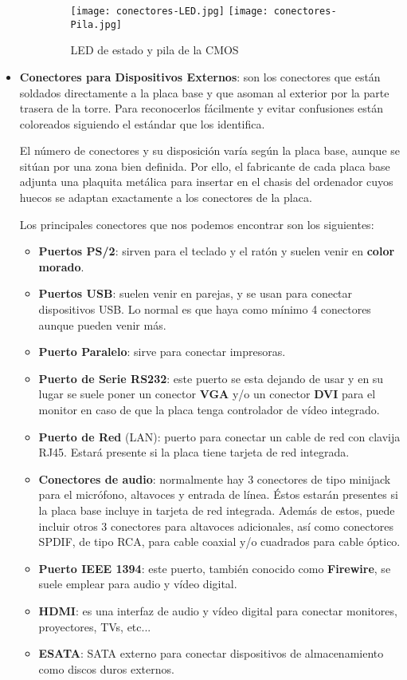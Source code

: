 \begin{itemize}
\begin{itemize}
     \begin{figure}[H]
         \centering
         \texttt{[image: conectores-LED.jpg]}  \hspace{2ex} \texttt{[image: conectores-Pila.jpg]}
         \caption{LED de estado y pila de la CMOS}
     \end{figure}
    \end{itemize}

    \item \textbf{Conectores para Dispositivos Externos}: son los conectores que están soldados directamente a la placa base y que asoman al exterior por la parte trasera de la torre. Para reconocerlos fácilmente y evitar confusiones están coloreados siguiendo el estándar que los identifica.

    El número de conectores y su disposición varía según la placa base, aunque se sitúan por una zona bien definida. Por ello, el fabricante de cada placa base adjunta una plaquita metálica para insertar en el chasis del ordenador cuyos huecos se adaptan exactamente a los conectores de la placa.

    Los principales conectores que nos podemos encontrar son los siguientes:

    \begin{itemize}
        \item \textbf{Puertos PS/2}: sirven para el teclado y el ratón y suelen venir en \textbf{color morado}.
        \item \textbf{Puertos USB}: suelen venir en parejas, y se usan para conectar dispositivos USB. Lo normal es que haya como mínimo 4 conectores aunque pueden venir más.
        \item \textbf{Puerto Paralelo}: sirve para conectar impresoras.
        \item \textbf{Puerto de Serie RS232}: este puerto se esta dejando de usar y en su lugar se suele poner un conector \textbf{VGA} y/o un conector \textbf{DVI} para el monitor en caso de que la placa tenga controlador de vídeo integrado.
        \item \textbf{Puerto de Red} (LAN): puerto para conectar un cable de red con clavija RJ45. Estará presente si la placa tiene tarjeta de red integrada.
        \item \textbf{Conectores de audio}: normalmente hay 3 conectores de tipo minijack para el micrófono, altavoces y entrada de línea. Éstos estarán presentes si la placa base incluye in tarjeta de red integrada. Además de estos, puede incluir otros 3 conectores para altavoces adicionales, así como conectores SPDIF, de tipo RCA, para cable coaxial y/o cuadrados para cable óptico.
        \item \textbf{Puerto IEEE 1394}: este puerto, también conocido como \textbf{Firewire}, se suele emplear para audio y vídeo digital.
        \item \textbf{HDMI}: es una interfaz de audio y vídeo digital para conectar monitores, proyectores, TVs, etc...
        \item \textbf{ESATA}: SATA externo para conectar dispositivos de almacenamiento como discos duros externos.
    \end{itemize}


\end{itemize}
